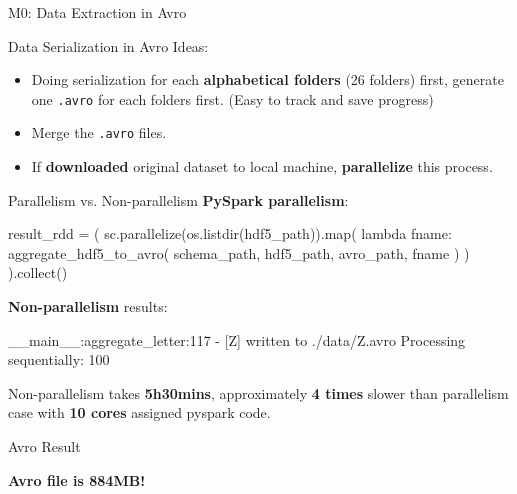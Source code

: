 \documentclass{beamer}
\begin{document}
\begin{section}{M0: Data Extraction in Avro}
    \begin{frame}{Data Serialization in Avro}
    Ideas:
        \begin{itemize}
            \item Doing serialization for each \textbf{alphabetical folders} (26 folders) first, generate one \texttt{.avro} for each folders first. (Easy to track and save progress)
            \item Merge the \texttt{.avro} files.
            \item If \textbf{downloaded} original dataset to local machine, \textbf{parallelize} this process.
        \end{itemize}
    \end{frame}
    
    \begin{frame}[fragile]{Parallelism vs. Non-parallelism}
        \textbf{PySpark parallelism}:
\begin{mycodepython}
result_rdd = (
    sc.parallelize(os.listdir(hdf5_path)).map(
        lambda fname: aggregate_hdf5_to_avro(
            schema_path, hdf5_path, avro_path, fname
        )
    )
).collect()
\end{mycodepython}
        \textbf{Non-parallelism} results:

\begin{bashcode}
__main__:aggregate_letter:117 - [Z] written to ./data/Z.avro
Processing sequentially: 100%
\end{bashcode}

\begin{center}
    Non-parallelism takes \textbf{5h30mins}, approximately \textbf{4 times} slower than parallelism case with \textbf{10 cores} assigned pyspark code.
\end{center}
    \end{frame}

    \begin{frame}{Avro Result}
    \centering

    \LARGE{\textbf{Avro file is 884MB!}}
        
    \end{frame}
\end{section}
\end{document}
